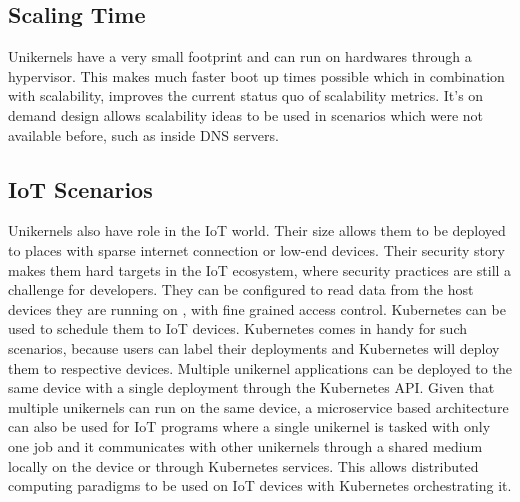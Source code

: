\subsection{Scaling Time}
Unikernels have a very small footprint and can run on hardwares through a hypervisor. This makes much faster boot up times possible which in combination with scalability, improves the current status quo of scalability metrics. It's on demand design allows scalability ideas to be used in scenarios which were not available before, such as inside DNS servers.

\subsection{IoT Scenarios}
Unikernels also have role in the IoT world. Their size allows them to be deployed to places with sparse internet connection or low-end devices. Their security story makes them hard targets in the IoT ecosystem, where security practices are still a challenge for developers\cite{iot-sec}. They can be configured to read data from the host devices they are running on , with fine grained access control. Kubernetes can be used to schedule them to IoT devices. Kubernetes comes in handy for such scenarios, because users can label their deployments and Kubernetes will deploy them to respective devices. Multiple unikernel applications can be deployed to the same device with a single deployment through the Kubernetes API. Given that multiple unikernels can run on the same device, a microservice based architecture can also be used for IoT programs where a single unikernel is tasked with only one job and it communicates with other unikernels through a shared medium locally on the device or through Kubernetes services. This allows distributed computing paradigms to be used on IoT devices with Kubernetes orchestrating it.


